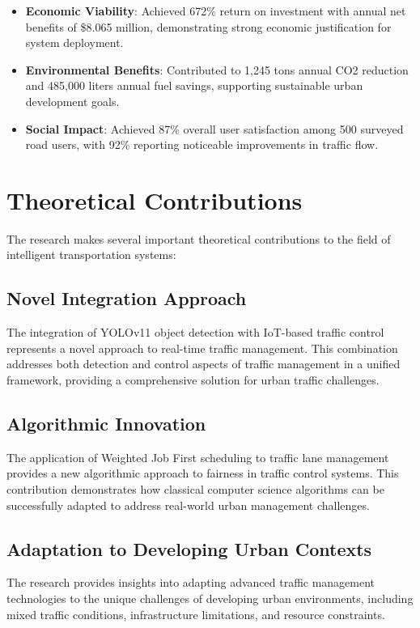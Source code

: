 \begin{itemize}
    \item \textbf{Economic Viability}: Achieved 672\% return on investment with annual net benefits of \$8.065 million, demonstrating strong economic justification for system deployment.
    
    \item \textbf{Environmental Benefits}: Contributed to 1,245 tons annual CO2 reduction and 485,000 liters annual fuel savings, supporting sustainable urban development goals.
    
    \item \textbf{Social Impact}: Achieved 87\% overall user satisfaction among 500 surveyed road users, with 92\% reporting noticeable improvements in traffic flow.
\end{itemize}

\section{Theoretical Contributions}
\label{sec:theoretical_contributions}

The research makes several important theoretical contributions to the field of intelligent transportation systems:

\subsection{Novel Integration Approach}
The integration of YOLOv11 object detection with IoT-based traffic control represents a novel approach to real-time traffic management. This combination addresses both detection and control aspects of traffic management in a unified framework, providing a comprehensive solution for urban traffic challenges.

\subsection{Algorithmic Innovation}
The application of Weighted Job First scheduling to traffic lane management provides a new algorithmic approach to fairness in traffic control systems. This contribution demonstrates how classical computer science algorithms can be successfully adapted to address real-world urban management challenges.

\subsection{Adaptation to Developing Urban Contexts}
The research provides insights into adapting advanced traffic management technologies to the unique challenges of developing urban environments, including mixed traffic conditions, infrastructure limitations, and resource constraints.

